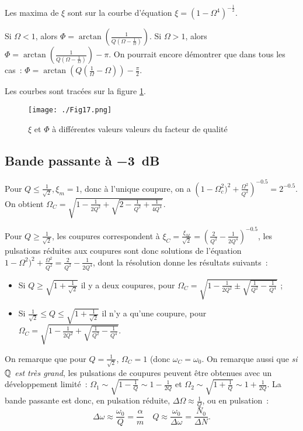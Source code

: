 Les maxima de \(\xi\) sont sur la courbe d'équation \(\xi = 
(1-\Omega^4)^{-\frac{1}{2}}\).

Si \(\Omega <1\), alors \(\Phi = 
\arctan\left(\frac{1}{Q\left(\Omega-\frac{1}{\Omega}\right)}\right)\). Si 
\(\Omega >1\), alors \(\Phi = 
\arctan\left(\frac{1}{Q\left(\Omega-\frac{1}{\Omega}\right)}\right) - \pi\). On 
pourrait encore démontrer que dans tous les cas~: \(\Phi = 
\arctan\left(Q\left(\frac{1}{\Omega}-\Omega\right)\right)-\frac{\pi}{2}\).

Les courbes sont tracées sur la figure \ref{fig:oscforcees}.

\begin{figure}[!h]
  \centering
  \texttt{[image: ./Fig17.png]}
  \caption{\(\xi\) et \(\Phi\) à différentes valeurs valeurs du facteur de 
  qualité}
  \label{fig:oscforcees}
\end{figure}

\subsection{Bande passante à \SI{-3}{\deci\bel}}

Pour \(Q \leq \frac{1}{\sqrt{2}}, \xi_m = 1\), donc à l'unique coupure, on a 
\(\left(1-\Omega_c^2)^2+\frac{\Omega^2}{Q^2}\right)^{-0.5} = 2^{-0.5}\). On 
obtient \(\Omega_C = \sqrt{1 - \frac{1}{2Q^2} + \sqrt{2 - \frac{1}{Q^2} + 
\frac{1}{4Q^4}}}\).

Pour \(Q \geqslant \frac{1}{\sqrt{2}}\), les coupures correspondent à \(\xi_C = 
\frac{\xi_M}{\sqrt{2}} = \left(\frac{2}{Q^2}-\frac{1}{2Q^4}\right)^{-0.5}\), les 
pulsations réduites aux coupures sont donc solutions de l'équation 
\(1-\Omega^2)^2 +\frac{\Omega^2}{Q^2} = \frac{2}{Q^2} - \frac{1}{2Q^4}\), dont 
la résolution donne les résultats suivants~:
\begin{itemize}
  \item Si \(Q \geqslant \sqrt{1 + \frac{1}{\sqrt{2}}}\) il y a deux coupures, 
    pour \(\Omega_C = \sqrt{1-\frac{1}{2Q^2} \pm \sqrt{\frac{1}{Q^2} - 
    \frac{1}{Q^4}}}\) ;
  \item Si \(\frac{1}{\sqrt{2}} \leqslant Q \leqslant \sqrt{1 + 
    \frac{1}{\sqrt{2}}}\) il n'y a qu'une coupure, 
    pour \(\Omega_C = \sqrt{1-\frac{1}{2Q^2} + \sqrt{\frac{1}{Q^2} - 
    \frac{1}{Q^4}}}\).
\end{itemize}
On remarque que pour \(Q = \frac{1}{\sqrt{2}}\), \(\Omega_C = 1\) (donc 
\(\omega_C = \omega_0\). On remarque aussi que \emph{si \(\mathbb{Q}\) est très grand}, 
les pulsations de coupures peuvent être obtenues avec un développement limité~: 
\(\Omega_1 \sim \sqrt{1-\frac{1}{Q}} \sim 1-\frac{1}{2Q}\) et \(\Omega_2 \sim 
\sqrt{1+\frac{1}{Q}} \sim 1+\frac{1}{2Q}\). La bande passante est donc, en 
pulsation réduite, \(\Delta\Omega \approx \frac{1}{Q}\), ou en pulsation~:
\begin{equation}
  \Delta\omega \approx \frac{\omega_0}{Q} = \frac{\alpha}{m} \quad Q \approx 
  \frac{\omega_0}{\Delta\omega}=\frac{N_0}{\Delta N}.
\end{equation}


